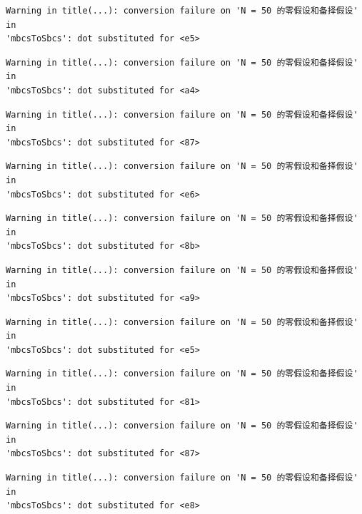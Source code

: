 \documentclass[
  letterpaper,
  DIV=11,
  numbers=noendperiod]{scrreprt}
\begin{document}
\begin{verbatim}
Warning in title(...): conversion failure on 'N = 50 的零假设和备择假设' in
'mbcsToSbcs': dot substituted for <e5>
\end{verbatim}

\begin{verbatim}
Warning in title(...): conversion failure on 'N = 50 的零假设和备择假设' in
'mbcsToSbcs': dot substituted for <a4>
\end{verbatim}

\begin{verbatim}
Warning in title(...): conversion failure on 'N = 50 的零假设和备择假设' in
'mbcsToSbcs': dot substituted for <87>
\end{verbatim}

\begin{verbatim}
Warning in title(...): conversion failure on 'N = 50 的零假设和备择假设' in
'mbcsToSbcs': dot substituted for <e6>
\end{verbatim}

\begin{verbatim}
Warning in title(...): conversion failure on 'N = 50 的零假设和备择假设' in
'mbcsToSbcs': dot substituted for <8b>
\end{verbatim}

\begin{verbatim}
Warning in title(...): conversion failure on 'N = 50 的零假设和备择假设' in
'mbcsToSbcs': dot substituted for <a9>
\end{verbatim}

\begin{verbatim}
Warning in title(...): conversion failure on 'N = 50 的零假设和备择假设' in
'mbcsToSbcs': dot substituted for <e5>
\end{verbatim}

\begin{verbatim}
Warning in title(...): conversion failure on 'N = 50 的零假设和备择假设' in
'mbcsToSbcs': dot substituted for <81>
\end{verbatim}

\begin{verbatim}
Warning in title(...): conversion failure on 'N = 50 的零假设和备择假设' in
'mbcsToSbcs': dot substituted for <87>
\end{verbatim}

\begin{verbatim}
Warning in title(...): conversion failure on 'N = 50 的零假设和备择假设' in
'mbcsToSbcs': dot substituted for <e8>
\end{verbatim}
\end{document}
